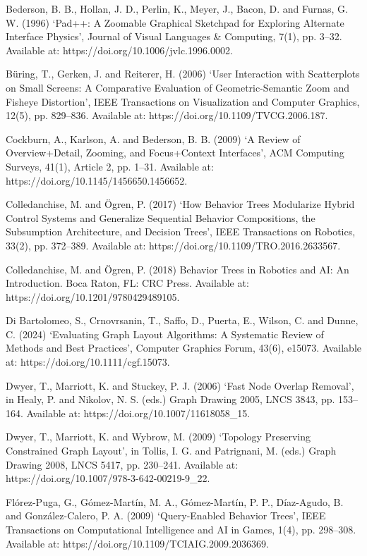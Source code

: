 \documentclass[11pt,a4paper,oneside,extrafontsizes]{memoir}
\begin{document}
Bederson, B. B., Hollan, J. D., Perlin, K., Meyer, J., Bacon, D. and Furnas, G. W. (1996) ‘Pad++: A Zoomable Graphical Sketchpad for Exploring Alternate Interface Physics’, Journal of Visual Languages \& Computing, 7(1), pp. 3–32. Available at: https://doi.org/10.1006/jvlc.1996.0002.

Büring, T., Gerken, J. and Reiterer, H. (2006) ‘User Interaction with Scatterplots on Small Screens: A Comparative Evaluation of Geometric-Semantic Zoom and Fisheye Distortion’, IEEE Transactions on Visualization and Computer Graphics, 12(5), pp. 829–836. Available at: https://doi.org/10.1109/TVCG.2006.187.

Cockburn, A., Karlson, A. and Bederson, B. B. (2009) ‘A Review of Overview+Detail, Zooming, and Focus+Context Interfaces’, ACM Computing Surveys, 41(1), Article 2, pp. 1–31. Available at: https://doi.org/10.1145/1456650.1456652.

Colledanchise, M. and Ögren, P. (2017) ‘How Behavior Trees Modularize Hybrid Control Systems and Generalize Sequential Behavior Compositions, the Subsumption Architecture, and Decision Trees’, IEEE Transactions on Robotics, 33(2), pp. 372–389. Available at: https://doi.org/10.1109/TRO.2016.2633567.

Colledanchise, M. and Ögren, P. (2018) Behavior Trees in Robotics and AI: An Introduction. Boca Raton, FL: CRC Press. Available at: https://doi.org/10.1201/9780429489105.

Di Bartolomeo, S., Crnovrsanin, T., Saffo, D., Puerta, E., Wilson, C. and Dunne, C. (2024) ‘Evaluating Graph Layout Algorithms: A Systematic Review of Methods and Best Practices’, Computer Graphics Forum, 43(6), e15073. Available at: https://doi.org/10.1111/cgf.15073.

Dwyer, T., Marriott, K. and Stuckey, P. J. (2006) ‘Fast Node Overlap Removal’, in Healy, P. and Nikolov, N. S. (eds.) Graph Drawing 2005, LNCS 3843, pp. 153–164. Available at: https://doi.org/10.1007/11618058\_15.

Dwyer, T., Marriott, K. and Wybrow, M. (2009) ‘Topology Preserving Constrained Graph Layout’, in Tollis, I. G. and Patrignani, M. (eds.) Graph Drawing 2008, LNCS 5417, pp. 230–241. Available at: https://doi.org/10.1007/978-3-642-00219-9\_22.

Flórez-Puga, G., Gómez-Martín, M. A., Gómez-Martín, P. P., Díaz-Agudo, B. and González-Calero, P. A. (2009) ‘Query-Enabled Behavior Trees’, IEEE Transactions on Computational Intelligence and AI in Games, 1(4), pp. 298–308. Available at: https://doi.org/10.1109/TCIAIG.2009.2036369.
\end{document}
